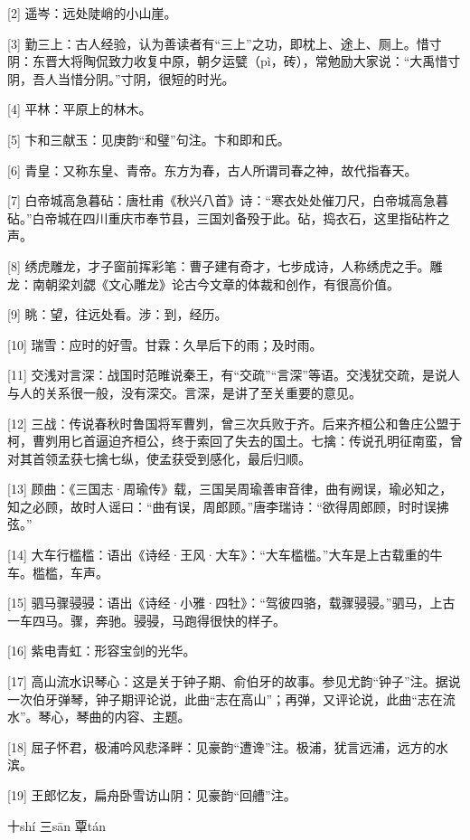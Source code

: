 \documentclass[12pt,UTF8]{ctexbook}
\begin{document}
[2] 遥岑：远处陡峭的小山崖。

[3] 勤三上：古人经验，认为善读者有“三上”之功，即枕上、途上、厕上。惜寸阴：东晋大将陶侃致力收复中原，朝夕运甓（pì，砖），常勉励大家说：“大禹惜寸阴，吾人当惜分阴。”寸阴，很短的时光。

[4] 平林：平原上的林木。

[5] 卞和三献玉：见庚韵“和璧”句注。卞和即和氏。

[6] 青皇：又称东皇、青帝。东方为春，古人所谓司春之神，故代指春天。

[7] 白帝城高急暮砧：唐杜甫《秋兴八首》诗：“寒衣处处催刀尺，白帝城高急暮砧。”白帝城在四川重庆市奉节县，三国刘备殁于此。砧，捣衣石，这里指砧杵之声。

[8] 绣虎雕龙，才子窗前挥彩笔：曹子建有奇才，七步成诗，人称绣虎之手。雕龙：南朝梁刘勰《文心雕龙》论古今文章的体裁和创作，有很高价值。

[9] 眺：望，往远处看。涉：到，经历。

[10] 瑞雪：应时的好雪。甘霖：久旱后下的雨；及时雨。

[11] 交浅对言深：战国时范睢说秦王，有“交疏”“言深”等语。交浅犹交疏，是说人与人的关系很一般，没有深交。言深，是讲了至关重要的意见。

[12] 三战：传说春秋时鲁国将军曹刿，曾三次兵败于齐。后来齐桓公和鲁庄公盟于柯，曹刿用匕首逼迫齐桓公，终于索回了失去的国土。七擒：传说孔明征南蛮，曾对其首领孟获七擒七纵，使孟获受到感化，最后归顺。

[13] 顾曲：《三国志·周瑜传》载，三国吴周瑜善审音律，曲有阙误，瑜必知之，知之必顾，故时人谣曰：“曲有误，周郎顾。”唐李瑞诗：“欲得周郎顾，时时误拂弦。”

[14] 大车行槛槛：语出《诗经·王风·大车》：“大车槛槛。”大车是上古载重的牛车。槛槛，车声。

[15] 驷马骤骎骎：语出《诗经·小雅·四牡》：“驾彼四骆，载骤骎骎。”驷马，上古一车四马。骤，奔驰。骎骎，马跑得很快的样子。

[16] 紫电青虹：形容宝剑的光华。

[17] 高山流水识琴心：这是关于钟子期、俞伯牙的故事。参见尤韵“钟子”注。据说一次伯牙弹琴，钟子期评论说，此曲“志在高山”；再弹，又评论说，此曲“志在流水”。琴心，琴曲的内容、主题。

[18] 屈子怀君，极浦吟风悲泽畔：见豪韵“遭谗”注。极浦，犹言远浦，远方的水滨。

[19] 王郎忆友，扁舟卧雪访山阴：见豪韵“回艚”注。





十shí 三sān 覃tán
\end{document}
